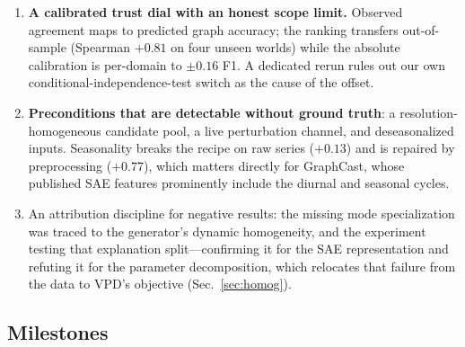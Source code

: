 \begin{enumerate}[nosep]
        give the two structural reasons the naive statistic fails---shared-map
        error and the read/write geometry asymmetry---and both carry beyond
        SAVAR.
  \item \textbf{A calibrated trust dial with an honest scope limit.} Observed
        agreement maps to predicted graph accuracy; the ranking transfers
        out-of-sample (Spearman $+0.81$ on four unseen worlds) while the absolute
        calibration is per-domain to ${\pm}0.16$ F1. A dedicated rerun rules out
        our own conditional-independence-test switch as the cause of the offset.
  \item \textbf{Preconditions that are detectable without ground truth}: a
        resolution-homogeneous candidate pool, a live perturbation channel, and
        deseasonalized inputs. Seasonality breaks the recipe on raw series
        ($+0.13$) and is repaired by preprocessing ($+0.77$), which matters
        directly for GraphCast, whose published SAE features prominently include
        the diurnal and seasonal cycles.
  \item An attribution discipline for negative results: the missing mode
        specialization was traced to the generator's dynamic homogeneity, and the
        experiment testing that explanation split---confirming it for the SAE
        representation and refuting it for the parameter decomposition, which
        relocates that failure from the data to VPD's objective
        (Sec.~\ref{sec:homog}).
\end{enumerate}

\subsection{Milestones}

